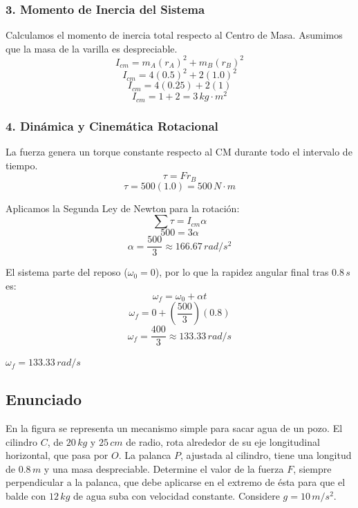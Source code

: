 \documentclass[12pt, a4paper]{article}
\begin{document}
\subsubsection*{3. Momento de Inercia del Sistema}
Calculamos el momento de inercia total respecto al Centro de Masa. Asumimos que la masa de la varilla es despreciable.
$$I_{cm} = m_A (r_A)^2 + m_B (r_B)^2$$
$$I_{cm} = 4 (0.5)^2 + 2 (1.0)^2$$
$$I_{cm} = 4 (0.25) + 2 (1)$$
$$I_{cm} = 1 + 2 = 3 \, \si{kg\cdot m^2}$$

\subsubsection*{4. Dinámica y Cinemática Rotacional}
La fuerza genera un torque constante respecto al CM durante todo el intervalo de tiempo.
$$\tau = F r_B$$
$$\tau = 500(1.0) = 500 \, \si{N\cdot m}$$

Aplicamos la Segunda Ley de Newton para la rotación:
$$\sum \tau = I_{cm} \alpha$$
$$500 = 3 \alpha$$
$$\alpha = \frac{500}{3} \approx 166.67 \, \si{rad/s^2}$$

El sistema parte del reposo ($\omega_0 = 0$), por lo que la rapidez angular final tras $0.8 \, \si{s}$ es:
$$\omega_f = \omega_0 + \alpha t$$
$$\omega_f = 0 + \left( \frac{500}{3} \right) (0.8)$$
$$\omega_f = \frac{400}{3} \approx 133.33 \, \si{rad/s}$$

\begin{tcolorbox}[colback=green!5!white, colframe=green!50!black, title=Respuesta Final]
\centering \Large $\omega_f = 133.33 \, \si{rad/s}$
\end{tcolorbox}

\newpage

\subsection*{Enunciado}
En la figura se representa un mecanismo simple para sacar agua de un pozo. El cilindro $C$, de $20 \, \si{kg}$ y $25 \, \si{cm}$ de radio, rota alrededor de su eje longitudinal horizontal, que pasa por $O$. La palanca $P$, ajustada al cilindro, tiene una longitud de $0.8 \, \si{m}$ y una masa despreciable. Determine el valor de la fuerza $F$, siempre perpendicular a la palanca, que debe aplicarse en el extremo de ésta para que el balde con $12 \, \si{kg}$ de agua suba con velocidad constante. Considere $g = 10 \, \si{m/s^2}$.
\end{document}

